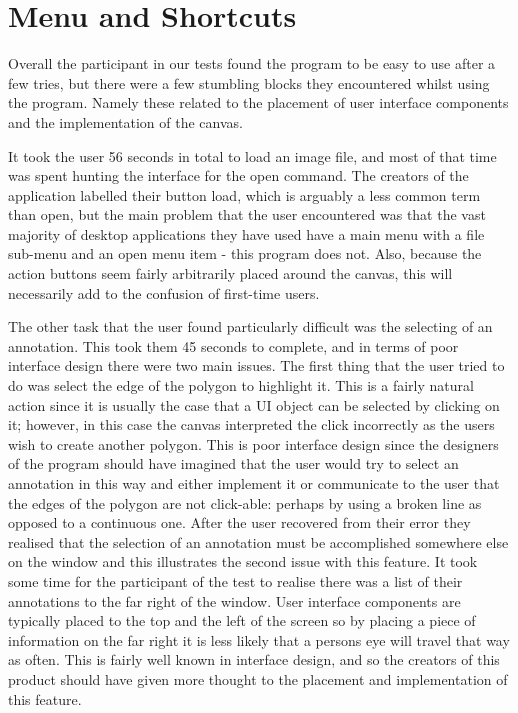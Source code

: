 \section{Menu and Shortcuts}

Overall the participant in our tests found the program to be easy to use after a few tries, but there were a few stumbling blocks they encountered whilst using the program.  Namely these related to the placement of user interface components and the implementation of the canvas.

It took the user 56 seconds in total to load an image file, and most of that time was spent hunting the interface for the open command.  The creators of the application labelled their button load, which is arguably a less common term than open, but the main problem that the user encountered was that the vast majority of desktop applications they have used have a main menu with a file sub-menu and an open menu item - this program does not.  Also, because the action buttons seem fairly arbitrarily placed around the canvas, this will necessarily add to the confusion of first-time users.

The other task that the user found particularly difficult was the selecting of an annotation.  This took them 45 seconds to complete, and in terms of poor interface design there were two main issues.  The first thing that the user tried to do was select the edge of the polygon to highlight it.  This is a fairly natural action since it is usually the case that a UI object can be selected by clicking on it; however, in this case the canvas interpreted the click incorrectly as the users wish to create another polygon.  This is poor interface design since the designers of the program should have imagined that the user would try to select an annotation in this way and either implement it or communicate to the user that the edges of the polygon are not click-able: perhaps by using a broken line as opposed to a continuous one.  After the user recovered from their error they realised that the selection of an annotation must be accomplished somewhere else on the window and this illustrates the second issue with this feature.  It took some time for the participant of the test to realise there was a list of their annotations to the far right of the window.  User interface components are typically placed to the top and the left of the screen so by placing a piece of information on the far right it is less likely that a persons eye will travel that way as often.  This is fairly well known in interface design, and so the creators of this product should have given more thought to the placement and implementation of this feature.
